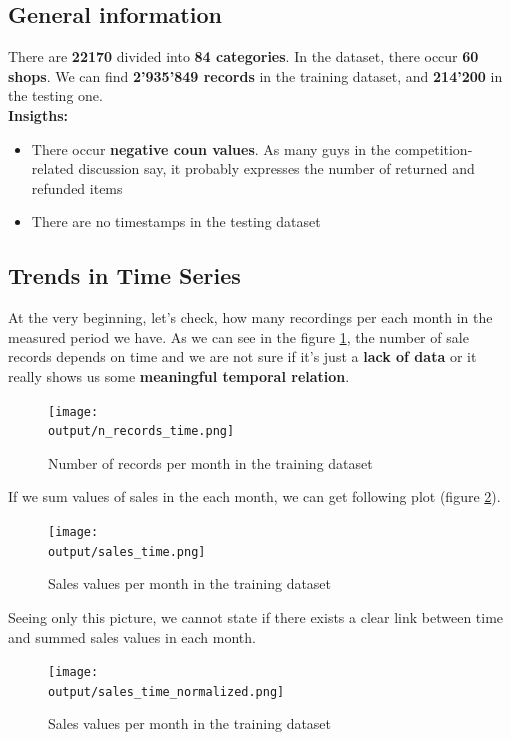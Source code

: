 \documentclass[12pt,twoside,a4paper]{memoir}
\def \output {../output}
\begin{document}
\subsection{General information}
There are  \textbf{22170} divided into \textbf{84 categories}. In the dataset, there occur \textbf{60 shops}. We can find \textbf{2'935'849 records} in the training dataset, and \textbf{214'200} in the testing one.
\newline \\
\textbf{Insigths:}
\begin{itemize}
\item There occur \textbf{negative coun values}. As many guys in the competition-related discussion say, it probably expresses the number of returned and refunded items
\item There are no timestamps in the testing dataset
\end{itemize}

\subsection{Trends in Time Series}

At the very beginning, let's check, how many recordings per each month in the measured period we have. As we can see in the figure \ref{fig:nRecords}, the number of sale records depends on time and we are not sure if it's just a \textbf{lack of data} or it really shows us some \textbf{meaningful temporal relation}.

	\begin{figure}[ht]
		\centering
		\texttt{[image: \\output/n\_records\_time.png]}
		\caption{Number of records per month in the training dataset}
	\label{fig:nRecords}
	\end{figure}

If we sum values of sales in the each month, we can get following plot (figure \ref{fig:salesValues}).

	\begin{figure}[H]
		\centering
		\texttt{[image: \\output/sales\_time.png]}
		\caption{Sales values per month in the training dataset}
	\label{fig:salesValues}
	\end{figure}
Seeing only this picture, we cannot state if there exists a clear link between time and summed sales values in each month. 

	\begin{figure}[H]
		\centering
		\texttt{[image: \\output/sales\_time\_normalized.png]}
		\caption{Sales values per month in the training dataset}
	\label{fig:salesRecordsValues}
	\end{figure}
\end{document}
